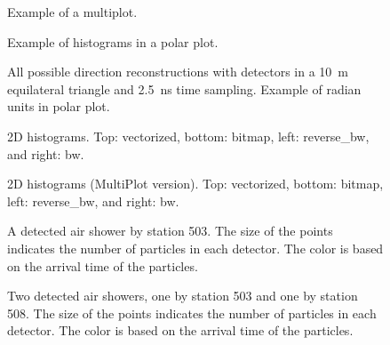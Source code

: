 \documentclass[a4paper,11pt]{article}
\begin{document}
\begin{figure}
\centering

\caption{Example of a multiplot.}
\end{figure}

\begin{figure}
\centering

\caption{Example of histograms in a polar plot.}
\end{figure}

\begin{figure}
\centering

\caption{All possible direction reconstructions with detectors in a
\SI{10}{\meter} equilateral triangle and \SI{2.5}{\nano\second} time
sampling. Example of radian units in polar plot.}
\end{figure}

\begin{figure}
\centering

\caption{2D histograms. Top: vectorized, bottom: bitmap, left:
reverse\_bw, and right: bw.}
\end{figure}

\begin{figure}
\centering

\caption{2D histograms (MultiPlot version). Top: vectorized, bottom:
bitmap, left: reverse\_bw, and right: bw.}
\end{figure}

\begin{figure}
\centering

\caption{A detected air shower by station 503. The size of the points
indicates the number of particles in each detector. The color is based
on the arrival time of the particles.}
\end{figure}

\begin{figure}
\centering

\caption{Two detected air showers, one by station 503 and one by station
508. The size of the points indicates the number of particles in each
detector. The color is based on the arrival time of the particles.}
\end{figure}
\end{document}
